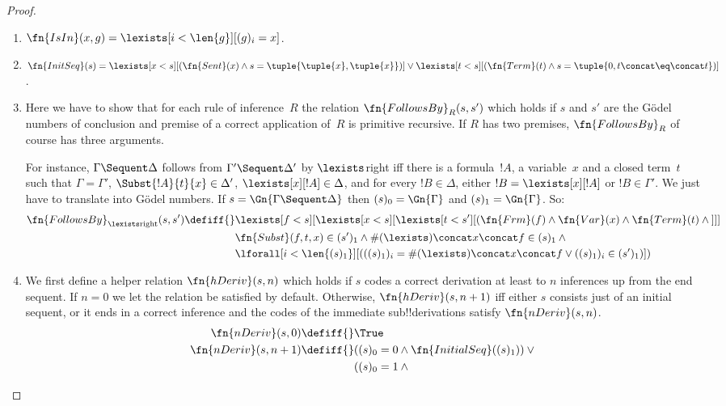 \documentclass[../../include/open-logic-section]{subfiles}
\begin{document}
\begin{proof}
\begin{enumerate}
\item $\fn{IsIn}(x, g) = \lexists[i < \len{g}][(g)_i = x]$.
\item $\fn{InitSeq}(s) = \lexists[x < s][(\fn{Sent}(x) \land s =
  \tuple{\tuple{x},\tuple{x}})] \lor \lexists[t<s][(\fn{Term}(t) \land
  s = \tuple{0, t\concat \eq \concat t})]$.
\item Here we have to show that for each rule of inference~$R$ the
  relation $\fn{FollowsBy}_R(s, s')$ which holds if $s$ and $s'$ are
  the G\"odel numbers of conclusion and premise of a correct
  application of~$R$ is primitive recursive.  If $R$ has two premises,
  $\fn{FollowsBy}_R$ of course has three arguments.

For instance, $\Gamma \Sequent \Delta$ follows from $\Gamma' \Sequent
\Delta'$ by $\lexists$right iff there is a formula~$!A$, a
variable~$x$ and a closed term~$t$ such that $\Gamma = \Gamma'$,
$\Subst{!A}{t}{x} \in \Delta'$, $\lexists[x][!A] \in \Delta$, and for
every $!B \in \Delta$, either $!B = \lexists[x][!A]$ or $!B \in
\Gamma'$.  We just have to translate into G\"odel numbers.  If $s =
\Gn{\Gamma \Sequent \Delta}$ then $(s)_0 = \Gn{\Gamma}$ and $(s)_1 =
\Gn{\Gamma}$. So:
\begin{align*}
\fn{FollowsBy}_{\lexists \text{right}}(s, s') \defiff {} & 
\lexists[f<s][\lexists[x<s][\lexists[t<s'][(\fn{Frm}(f) \land \fn{Var}(x) \land \fn{Term}(t) \land {}]]] \\
& \fn{Subst}(f,t,x) \in (s')_1 \land \#(\lexists) \concat x \concat f \in (s)_1 \land {}\\
& \lforall[i < \len{(s)_1}][(((s)_1)_i = \#(\lexists) \concat x \concat f \lor ((s)_1)_i \in (s')_1)])
\end{align*}
\item We first define a helper relation $\fn{hDeriv}(s,n)$ which holds
  if $s$ codes a correct derivation at least to $n$ inferences up from
  the end sequent.  If $n=0$ we let the relation be satisfied by
  default.  Otherwise, $\fn{hDeriv}(s, n+1)$ iff either $s$ consists
  just of an initial sequent, or it ends in a correct inference and
  the codes of the immediate sub!!{derivation}s satisfy
  $\fn{nDeriv}(s, n)$.
\begin{align*}
\fn{nDeriv}(s, 0) \defiff {} & \True\\
\fn{nDeriv}(s, n+1) \defiff {} & ((s)_0 = 0 \land \fn{InitialSeq}((s)_1)) \lor{}\\
& ((s)_0 = 1 \land {}\\

\end{align*}
\end{enumerate}
\end{proof}
\end{document}
